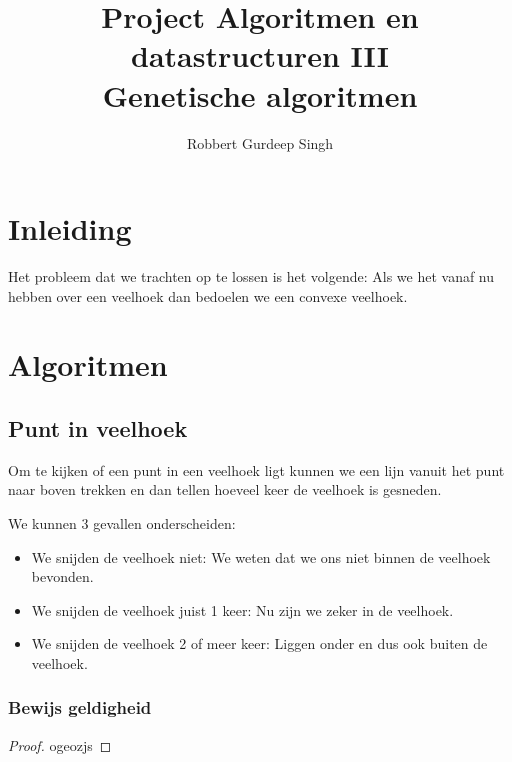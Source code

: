 \documentclass[11pt,a4paper]{article}
\author{Robbert Gurdeep Singh}
\title{{Project Algoritmen en datastructuren III}\\ \Huge Genetische algoritmen}
\date{}
\begin{document}
\twocolumn[\begin{@twocolumnfalse}
    \maketitle
\end{@twocolumnfalse}]


\section{Inleiding}
\label{sec:inleiding}
Het probleem dat we trachten op te lossen is het volgende: %
Als we het vanaf nu hebben over een veelhoek dan bedoelen we een convexe veelhoek.


\section{Algoritmen}
\label{sec:algoritmen}

\subsection{Punt in veelhoek}
\label{sub:algo-pt-in-poly}
Om te kijken of een punt in een veelhoek ligt kunnen we een lijn vanuit het punt naar boven 
trekken en dan tellen hoeveel keer de veelhoek is gesneden.

We kunnen 3 gevallen onderscheiden:
\begin{itemize}
\item We snijden de veelhoek niet: We weten dat we ons niet binnen de veelhoek bevonden.
\item We snijden de veelhoek juist 1 keer: Nu zijn we zeker in de veelhoek. 
\item We snijden de veelhoek 2 of meer keer: Liggen onder en dus ook buiten de veelhoek.
\end{itemize}

\subsubsection{Bewijs geldigheid}
\begin{proof}
ogeozjs
\end{proof}


\end{document}
